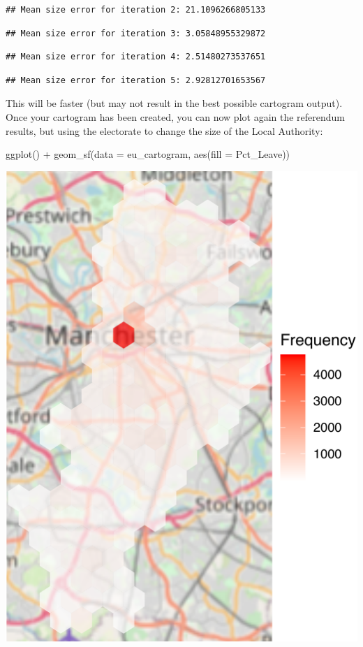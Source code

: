 \documentclass[
]{book}
\newenvironment{Shaded}{\begin{snugshade}}{\end{snugshade}}
\newcommand{\AttributeTok}[1]{\textcolor[rgb]{0.77,0.63,0.00}{#1}}
\newcommand{\FunctionTok}[1]{\textcolor[rgb]{0.00,0.00,0.00}{#1}}
\newcommand{\NormalTok}[1]{#1}
\newcommand{\SpecialCharTok}[1]{\textcolor[rgb]{0.00,0.00,0.00}{#1}}
\begin{document}
\begin{verbatim}
## Mean size error for iteration 2: 21.1096266805133
\end{verbatim}

\begin{verbatim}
## Mean size error for iteration 3: 3.05848955329872
\end{verbatim}

\begin{verbatim}
## Mean size error for iteration 4: 2.51480273537651
\end{verbatim}

\begin{verbatim}
## Mean size error for iteration 5: 2.92812701653567
\end{verbatim}

This will be faster (but may not result in the best possible cartogram output). Once your cartogram has been created, you can now plot again the referendum results, but using the electorate to change the size of the Local Authority:

\begin{Shaded}
\begin{Highlighting}[]
\FunctionTok{ggplot}\NormalTok{() }\SpecialCharTok{+}
  \FunctionTok{geom\_sf}\NormalTok{(}\AttributeTok{data =}\NormalTok{ eu\_cartogram, }\FunctionTok{aes}\NormalTok{(}\AttributeTok{fill =}\NormalTok{ Pct\_Leave)) }
\end{Highlighting}
\end{Shaded}

\includegraphics{crime_mapping_files/figure-latex/unnamed-chunk-129-1.pdf}
\end{document}
